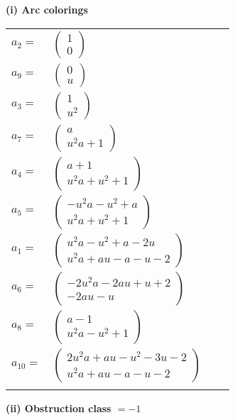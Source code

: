 \documentclass[1p]{elsarticle_modified}
\theoremstyle{definition}
\begin{document}
\flushleft \textbf{(i) Arc colorings}\\
\begin{tabular}{m{7pt} m{180pt} m{7pt} m{180pt} }
\flushright $a_{2}=$&$\begin{pmatrix}1\\0\end{pmatrix}$ \\
\flushright $a_{9}=$&$\begin{pmatrix}0\\u\end{pmatrix}$ \\
\flushright $a_{3}=$&$\begin{pmatrix}1\\u^2\end{pmatrix}$ \\
\flushright $a_{7}=$&$\begin{pmatrix}a\\u^2 a+1\end{pmatrix}$ \\
\flushright $a_{4}=$&$\begin{pmatrix}a+1\\u^2 a+u^2+1\end{pmatrix}$ \\
\flushright $a_{5}=$&$\begin{pmatrix}- u^2 a- u^2+a\\u^2 a+u^2+1\end{pmatrix}$ \\
\flushright $a_{1}=$&$\begin{pmatrix}u^2 a- u^2+a-2 u\\u^2 a+a u- a- u-2\end{pmatrix}$ \\
\flushright $a_{6}=$&$\begin{pmatrix}-2 u^2 a-2 a u+u+2\\-2 a u- u\end{pmatrix}$ \\
\flushright $a_{8}=$&$\begin{pmatrix}a-1\\u^2 a- u^2+1\end{pmatrix}$ \\
\flushright $a_{10}=$&$\begin{pmatrix}2 u^2 a+a u- u^2-3 u-2\\u^2 a+a u- a- u-2\end{pmatrix}$\\&\end{tabular}
\flushleft \textbf{(ii) Obstruction class $= -1$}\\~\\
\end{document}
